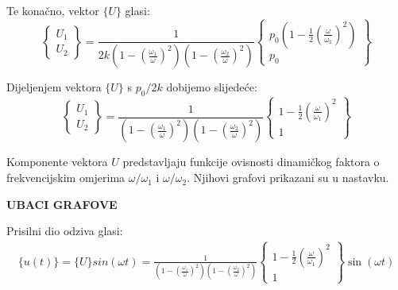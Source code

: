 \documentclass{rgn}
\newcommand\ffrac[2]{\frac{\displaystyle #1}{\displaystyle #2}}
\begin{document}
Te konačno, vektor $\{U\}$ glasi:
\begin{equation}\label{eq:vektor_u_konacno}
    \begin{Bmatrix}
        U_1\\
        U_2
    \end{Bmatrix}
    =
    \frac{1}{2k\left(1-\left(\ffrac{\omega_1}{\omega}\right)^2\right)\left(1-\left(\ffrac{\omega_2}{\omega}\right)^2\right)}
    \begin{Bmatrix}
        p_0\left(1-\ffrac{1}{2}\left(\ffrac{\omega}{\omega_1}\right)^2\right)\\
        p_0 
    \end{Bmatrix}
\end{equation}

Dijeljenjem vektora $\{U\}$ s $p_0/2k$ dobijemo slijedeće:
\begin{equation}
    \begin{Bmatrix}
        U_1\\
        U_2
    \end{Bmatrix}
    =
    \frac{1}{\left(1-\left(\ffrac{\omega_1}{\omega}\right)^2\right)\left(1-\left(\ffrac{\omega_2}{\omega}\right)^2\right)}
    \begin{Bmatrix}
        1-\ffrac{1}{2}\left(\ffrac{\omega}{\omega_1}\right)^2\\
        1 
    \end{Bmatrix}
\end{equation}


Komponente vektora $U$ predstavljaju funkcije ovisnosti dinamičkog faktora o 
frekvencijskim omjerima $\omega/\omega_1$ i $\omega/\omega_2$. Njihovi grafovi
prikazani su u nastavku.

\textbf{UBACI GRAFOVE}

Prisilni dio odziva glasi:
\begin{equation}
    \begin{split}
        \{u(t)\} = \{U\} sin(\omega t)
        =
        \frac{1}{\left(1-\left(\ffrac{\omega_1}{\omega}\right)^2\right)\left(1-\left(\ffrac{\omega_2}{\omega}\right)^2\right)}
    \begin{Bmatrix}
        1-\ffrac{1}{2}\left(\ffrac{\omega}{\omega_1}\right)^2\\
        1 
    \end{Bmatrix}
    \sin(\omega t)
    \end{split}
\end{equation}
\end{document}
